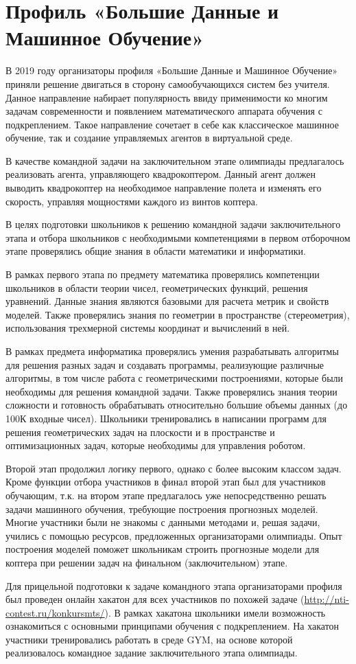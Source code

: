 

\chapter{Профиль «Большие Данные и Машинное Обучение»}

В 2019 году организаторы профиля «Большие Данные и Машинное Обучение»  приняли решение двигаться в сторону самообучающихся систем без учителя. Данное направление набирает популярность ввиду применимости ко многим задачам современности и появлением математического аппарата обучения с подкреплением. Такое направление сочетает в себе как классическое машинное обучение, так и создание управляемых агентов в виртуальной среде. 

В качестве командной задачи на заключительном этапе олимпиады предлагалось реализовать агента, управляющего квадрокоптером. Данный агент должен выводить квадрокоптер на необходимое направление полета и изменять его скорость, управляя мощностями каждого из винтов коптера.

В целях подготовки школьников к решению командной задачи заключительного этапа и отбора школьников с необходимыми компетенциями в первом отборочном этапе проверялись общие знания в области математики и информатики.

В рамках первого этапа по предмету математика проверялись компетенции школьников в области теории чисел, геометрических функций, решения уравнений. Данные знания являются базовыми для расчета метрик и свойств моделей. Также проверялись знания по геометрии в пространстве (стереометрия), использования трехмерной системы координат и вычислений в ней.  

В рамках предмета информатика проверялись умения разрабатывать алгоритмы для решения разных задач и создавать программы, реализующие различные алгоритмы, в том числе работа с геометрическими построениями, которые были необходимы для решения командной задачи. Также проверялись знания теории сложности и готовность обрабатывать относительно большие объемы данных (до 100К входные чисел). Школьники тренировались в написании программ для решения геометрических задач на плоскости и в пространстве и оптимизационных задач, которые необходимы для управления роботом.

Второй этап продолжил логику первого, однако с более высоким классом задач. Кроме функции отбора участников в финал второй этап был для участников обучающим, т.к. на втором этапе предлагалось уже непосредственно решать задачи машинного обучения, требующие построения прогнозных моделей. Многие участники были не знакомы с данными методами и, решая задачи, учились с помощью ресурсов, предложенных организаторами олимпиады.  Опыт построения моделей поможет школьникам строить прогнозные модели для коптера при решении задач на финальном (заключительном) этапе.

Для прицельной подготовки к задаче командного этапа организаторами профиля был проведен онлайн хакатон для всех участников по похожей задаче (\url{http://nti-contest.ru/konkursmts/}). В рамках хакатона школьники имели возможность ознакомиться с основными принципами обучения с подкреплением. На хакатон участники тренировались работать в среде GYM, на основе которой реализовалось командное задание заключительного этапа олимпиады. 
